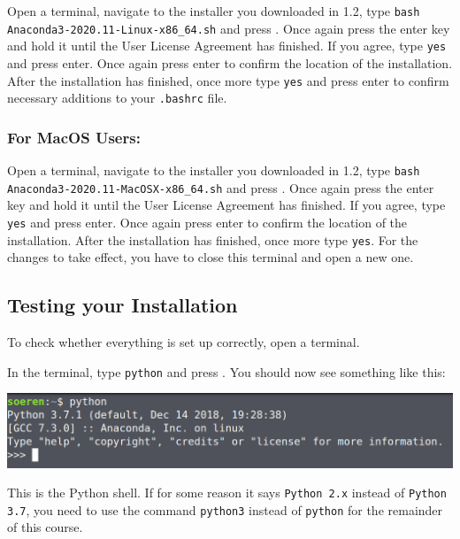 Open a terminal, navigate to the installer you downloaded in 1.2, type \texttt{bash Anaconda3-2020.11-Linux-x86\_64.sh} and press \keys{\return}. Once again press the enter key and hold it until the User License Agreement has finished. If you agree, type \texttt{yes} and press enter. Once again press enter to confirm the location of the installation. After the installation has finished, once more type \texttt{yes} and press enter to confirm necessary additions to your \texttt{.bashrc} file.


\subsubsection*{For MacOS Users:}

Open a terminal, navigate to the installer you downloaded in 1.2, type \texttt{bash Anaconda3-2020.11-MacOSX-x86\_64.sh} and press \keys{\return}. Once again press the enter key and hold it until the User License Agreement has finished. If you agree, type \texttt{yes} and press enter. Once again press enter to confirm the location of the installation. After the installation has finished, once more type \texttt{yes}. For the changes to take effect, you have to close this terminal and open a new one.


\subsection{Testing your Installation}

To check whether everything is set up correctly, open a terminal.

\vspace{1em}

\noindent In the terminal, type \texttt{python} and press \keys{\return}. You should now see something like this:

\vspace{1em}

\noindent \includegraphics[width=\textwidth]{01_Introduction/python_shell.png}

\vspace{1em}

\noindent This is the Python shell. If for some reason it says \texttt{Python 2.x} instead of \texttt{Python 3.7}, you need to use the command \texttt{python3} instead of \texttt{python} for the remainder of this course.

